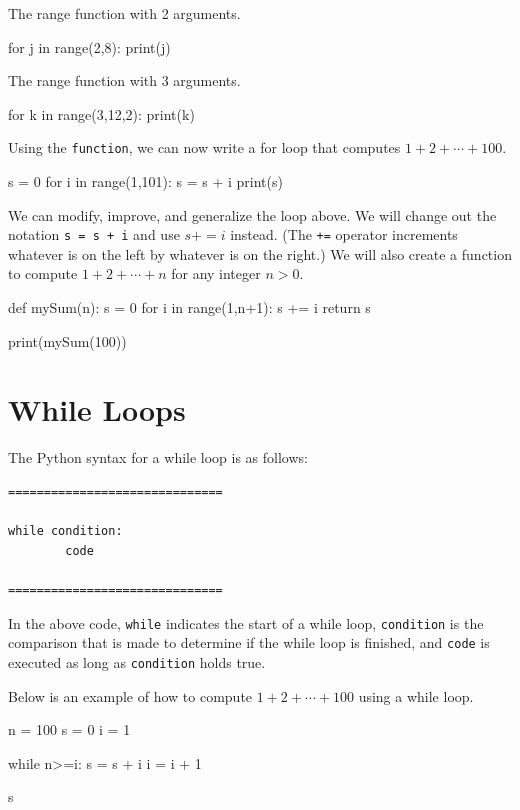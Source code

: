 \documentclass{ximera}
\begin{document}
The range function with 2 arguments.
\begin{sageCell}
for j in range(2,8):
     print(j)
\end{sageCell}

The range function with 3 arguments.
\begin{sageCell}
for k in range(3,12,2):
     print(k)
\end{sageCell}

Using the \verb|function|, we can now write a for loop that computes $1+2+\cdots+100$.

\begin{sageCell}
s = 0 
for i in range(1,101):
        s = s + i
print(s)
\end{sageCell}

We can modify, improve, and generalize the loop above. We will change out the notation \verb|s = s + i| and use $s += i$ instead. (The \verb|+=| operator increments whatever is on the left by whatever is on the right.) We will also create a function to compute $1+2+\cdots+n$ for any integer $n>0$.

\begin{sageCell}
def mySum(n):
        s = 0
        for i in range(1,n+1):
                s += i
        return s

print(mySum(100))
\end{sageCell}

\section{While Loops}

The Python syntax for a while loop is as follows:

\begin{verbatim}
==============================

while condition:
        code

==============================
\end{verbatim}

In the above code, \verb|while| indicates the start of a while loop, \verb|condition| is the comparison that is made to determine if the while loop is finished, and \verb|code| is executed as long as \verb|condition| holds true.

Below is an example of how to compute $1+2+\cdots+100$ using a while loop.

\begin{sageCell}
n = 100
s = 0
i = 1

while n>=i:
        s = s + i
	i = i + 1

s
\end{sageCell}
\end{document}
